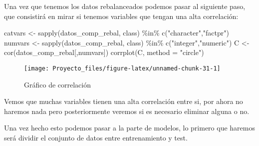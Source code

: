 \documentclass[
]{article}
\newenvironment{Shaded}{\begin{snugshade}}{\end{snugshade}}
\newcommand{\AttributeTok}[1]{\textcolor[rgb]{0.77,0.63,0.00}{#1}}
\newcommand{\FunctionTok}[1]{\textcolor[rgb]{0.00,0.00,0.00}{#1}}
\newcommand{\NormalTok}[1]{#1}
\newcommand{\OtherTok}[1]{\textcolor[rgb]{0.56,0.35,0.01}{#1}}
\newcommand{\SpecialCharTok}[1]{\textcolor[rgb]{0.00,0.00,0.00}{#1}}
\newcommand{\StringTok}[1]{\textcolor[rgb]{0.31,0.60,0.02}{#1}}
\begin{document}
\begin{Shaded}
\end{Shaded}

Una vez que tenemos los datos rebalanceados podemos pasar al siguiente
paso, que consistirá en mirar si tenemos variables que tengan una alta
correlación:

\begin{Shaded}
\begin{Highlighting}[]
\NormalTok{catvars }\OtherTok{\textless{}{-}} \FunctionTok{sapply}\NormalTok{(datos\_comp\_rebal, class) }\SpecialCharTok{\%in\%} \FunctionTok{c}\NormalTok{(}\StringTok{"character"}\NormalTok{,}\StringTok{"factpr"}\NormalTok{)}
\NormalTok{numvars }\OtherTok{\textless{}{-}} \FunctionTok{sapply}\NormalTok{(datos\_comp\_rebal, class) }\SpecialCharTok{\%in\%} \FunctionTok{c}\NormalTok{(}\StringTok{"integer"}\NormalTok{,}\StringTok{"numeric"}\NormalTok{)}
\NormalTok{C }\OtherTok{\textless{}{-}} \FunctionTok{cor}\NormalTok{(datos\_comp\_rebal[,numvars])}
\FunctionTok{corrplot}\NormalTok{(C, }\AttributeTok{method =} \StringTok{"circle"}\NormalTok{)}
\end{Highlighting}
\end{Shaded}

\begin{figure}

{\centering \texttt{[image: Proyecto\_files/figure-latex/unnamed-chunk-31-1]} 

}

\caption{Gráfico de correlación}\label{fig:unnamed-chunk-31}
\end{figure}

Vemos que muchas variables tienen una alta correlación entre si, por
ahora no haremos nada pero posteriormente veremos si es necesario
eliminar alguna o no.

Una vez hecho esto podemos pasar a la parte de modelos, lo primero que
haremos será dividir el conjunto de datos entre entrenamiento y test.
\end{document}
